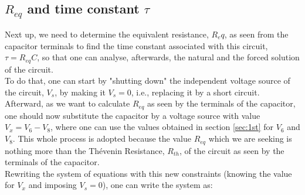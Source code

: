 \subsection{$R_{eq}$ and time constant $\tau$}
Next up, we need to determine the equivalent resistance, $R_eq$, as seen from the capacitor terminals to find the time constant associated with this circuit, $\tau = R_{eq}C$, so that one can analyse, afterwards, the natural and the forced solution of the circuit. \\

To do that, one can start by "shutting down" the independent voltage source of the circuit, $V_s$, by making it $V_s = 0$, i.e., replacing it by a short circuit. Afterward, as we want to calculate $R_{eq}$ as seen by the terminals of the capacitor, one should now substitute the capacitor by a voltage source with value $V_x = V_6 - V_8$, where one can use the values obtained in section \ref{sec:1st} for $V_6$ and $V_8$. This whole process is adopted because the value $R_{eq}$ which we are seeking is nothing more than the Thévenin Resistance, $R_{th}$, of the circuit as seen by the terminals of the capacitor. \\

Rewriting the system of equations with this new constraints (knowing the value for $V_x$ and imposing $V_s = 0$), one can write the system as:

